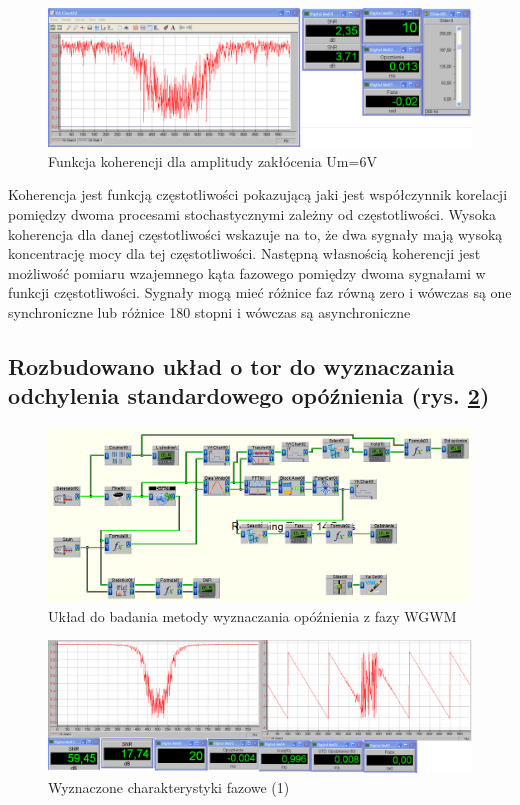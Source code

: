 \documentclass{classrep}
\begin{document}
\begin{figure}[H]
\centering
\includegraphics[width=0.8\linewidth]{wyk11}
\caption{Funkcja koherencji dla amplitudy zakłócenia Um=6V }
\label{fig:wyk11}
\end{figure}

Koherencja jest funkcją częstotliwości pokazującą jaki jest współczynnik korelacji pomiędzy dwoma procesami stochastycznymi zależny od częstotliwości. Wysoka koherencja dla danej częstotliwości wskazuje na to, że dwa sygnały mają wysoką koncentrację mocy dla tej częstotliwości. Następną własnością koherencji jest możliwość pomiaru wzajemnego kąta fazowego pomiędzy dwoma sygnałami w funkcji częstotliwości. Sygnały mogą mieć różnice faz równą zero i wówczas są one synchroniczne lub różnice 180 stopni i wówczas są asynchroniczne

\subsection{Rozbudowano układ o tor do wyznaczania odchylenia standardowego opóźnienia (rys. \ref{fig:sch5})}

\begin{figure}[H]
\centering
\includegraphics[width=0.8\linewidth]{sch5}
\caption{Układ do badania metody wyznaczania opóźnienia z fazy WGWM}
\label{fig:sch5}
\end{figure}

\begin{figure}[H]
\centering
\includegraphics[width=0.8\linewidth]{wyk13}
\caption{ Wyznaczone charakterystyki fazowe (1)}
\label{fig:wyk13}
\end{figure}
\end{document}
